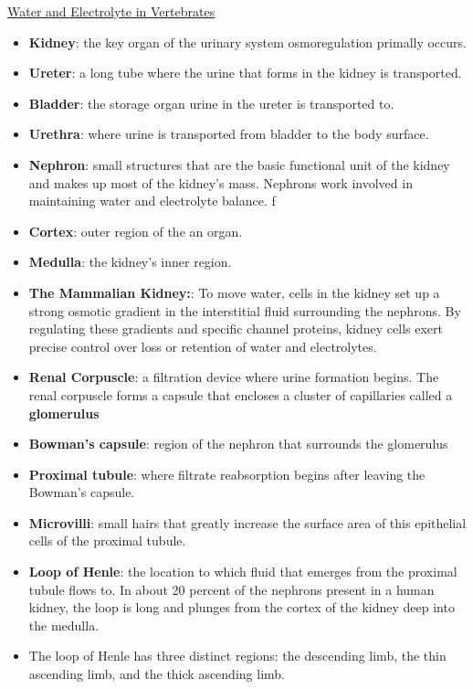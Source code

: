 \documentclass[12pt,letterpaper]{article}
\begin{document}
\hypertarget{40.5}{}
\begin{secbox}{\hyperlink{40}{Water and Electrolyte in Vertebrates}}{
    \begin{itemize}
        \item \textbf{Kidney}: the key organ of the urinary system osmoregulation primally occurs.
        \item \textbf{Ureter}: a long tube where the urine that forms in the kidney is transported.
        \item \textbf{Bladder}: the storage organ urine in the ureter is transported to. 
        \item \textbf{Urethra}: where urine is transported from bladder to the body surface.
        \item \textbf{Nephron}: small structures that are the basic functional unit of the
        kidney and makes up most of the kidney’s mass. Nephrons work involved in maintaining water and electrolyte balance.
        f\item \textbf{Cortex}: outer region of the an organ. 
        \item \textbf{Medulla}: the kidney’s inner region.
        \item \textbf{The Mammalian Kidney:}: To move water, cells in the kidney set up a strong osmotic gradient in the interstitial fluid surrounding the nephrons. By regulating these gradients and specific channel proteins, kidney cells exert precise control over loss or retention of water and electrolytes.
        \item \textbf{Renal Corpuscle}: a filtration device where urine formation begins. The renal corpuscle forms a capsule that encloses a cluster of capillaries called a \textbf{glomerulus}
        \item \textbf{Bowman's capsule}: region of the nephron that surrounds the glomerulus
        \item \textbf{Proximal tubule}: where filtrate reabsorption begins after leaving the Bowman's capsule. 
        \item \textbf{Microvilli}: small hairs that greatly increase the surface area of this epithelial cells of the proximal tubule.
        \item \textbf{Loop of Henle}: the location to which fluid that emerges from the proximal tubule flows to. In about 20 percent of the nephrons present in a human kidney, the loop is long and plunges from the cortex of the kidney deep into the medulla.
        \item The loop of Henle has three distinct regions: the descending limb, the thin ascending limb, and the thick ascending limb.

\end{itemize}}
\end{secbox}
\end{document}
